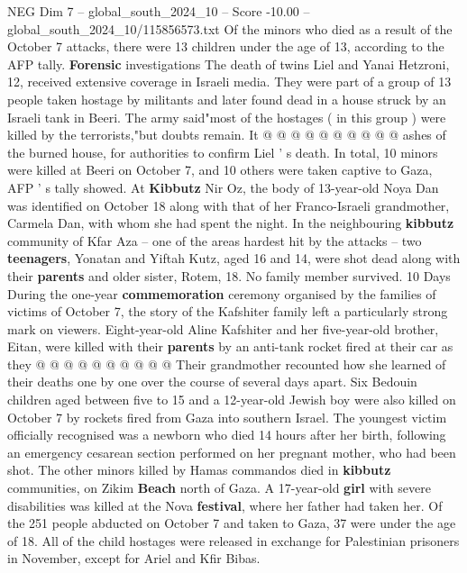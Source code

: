 \begin{textsample}{NEG Dim 7 – global\_south\_2024\_10 – Score -10.00 – global\_south\_2024\_10/115856573.txt}
Of the minors who died as a result of the October 7 attacks, there were 13 children under the age of 13, according to the AFP tally. \textbf{Forensic} investigations The death of twins Liel and Yanai Hetzroni, 12, received extensive coverage in Israeli media.
They were part of a group of 13 people taken hostage by militants and later found dead in a house struck by an Israeli tank in Beeri.
The army said"most of the hostages ( in this group ) were killed by the terrorists,"but doubts remain.
It @ @ @ @ @ @ @ @ @ @ ashes of the burned house, for authorities to confirm Liel ' s death.
In total, 10 minors were killed at Beeri on October 7, and 10 others were taken captive to Gaza, AFP ' s tally showed.
At \textbf{Kibbutz} Nir Oz, the body of 13-year-old Noya Dan was identified on October 18 along with that of her Franco-Israeli grandmother, Carmela Dan, with whom she had spent the night.
In the neighbouring \textbf{kibbutz} community of Kfar Aza -- one of the areas hardest hit by the attacks -- two \textbf{teenagers}, Yonatan and Yiftah Kutz, aged 16 and 14, were shot dead along with their \textbf{parents} and older sister, Rotem, 18.
No family member survived. 10 Days During the one-year \textbf{commemoration} ceremony organised by the families of victims of October 7, the story of the Kafshiter family left a particularly strong mark on viewers.
Eight-year-old Aline Kafshiter and her five-year-old brother, Eitan, were killed with their \textbf{parents} by an anti-tank rocket fired at their car as they @ @ @ @ @ @ @ @ @ @ Their grandmother recounted how she learned of their deaths one by one over the course of several days apart.
Six Bedouin children aged between five to 15 and a 12-year-old Jewish boy were also killed on October 7 by rockets fired from Gaza into southern Israel.
The youngest victim officially recognised was a newborn who died 14 hours after her birth, following an emergency cesarean section performed on her pregnant mother, who had been shot.
The other minors killed by Hamas commandos died in \textbf{kibbutz} communities, on Zikim \textbf{Beach} north of Gaza.
A 17-year-old \textbf{girl} with severe disabilities was killed at the Nova \textbf{festival}, where her father had taken her.
Of the 251 people abducted on October 7 and taken to Gaza, 37 were under the age of 18.
All of the child hostages were released in exchange for Palestinian prisoners in November, except for Ariel and Kfir Bibas.

\end{textsample}
